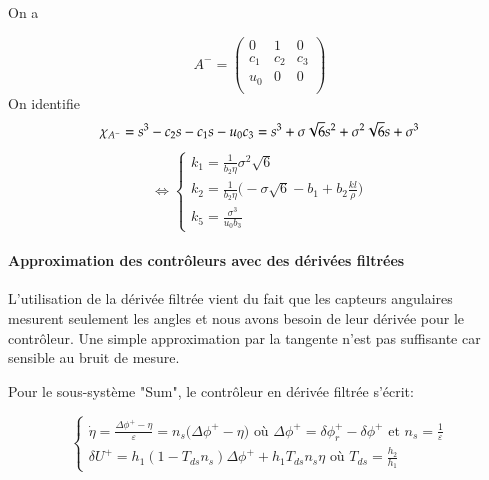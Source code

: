 \documentclass{report}
\begin{document}
On a

\begin{equation*}
    A^-=
    \begin{pmatrix}
        0 & 1 & 0 \\
        c_1 & c_2 & c_3 \\
        u_0 & 0 & 0 \\
    \end{pmatrix}
\end{equation*}
 On identifie
 \begin{equation*}
    \chi_{A^-} = s^3 - c_2s - c_1s - u_0c_3
    = s^3 + \sigma\sqrt{6}s^2 
    + \sigma^2\sqrt{6}s + \sigma^3 \\    
 \end{equation*}
 \begin{equation*}
    \Leftrightarrow
    \begin{cases}
        k_1 = \frac{1}{b_2\eta}\sigma^2\sqrt{6}  \\
        k_2 = \frac{1}{b_2\eta}\big(-\sigma\sqrt{6} - b_1 + b_2\frac{kl}{\rho} \big) \\
        k_5 = \frac{\sigma^3}{u_0b_3}  
    \end{cases}
 \end{equation*}

\paragraph{Approximation des contrôleurs avec des dérivées filtrées}

L'utilisation de la dérivée filtrée vient du fait que les capteurs
angulaires mesurent seulement les angles et nous avons besoin de
leur dérivée pour le contrôleur. Une simple approximation par la 
tangente n'est pas suffisante car sensible au bruit de mesure.

Pour le sous-système "Sum", le contrôleur en dérivée filtrée s'écrit:

\begin{equation*}
    \begin{cases}
        \dot{\eta} = \frac{\Delta \phi^+ - \eta}{\varepsilon}
        =  n_s\big(\Delta \phi^+ - \eta \big) 
        \text{ où } \Delta \phi^+ = \delta \phi^+_r - \delta \phi^+
        \text{ et } n_s = \frac{1}{\varepsilon} \\
        \delta{U^+} = h_1(1 - T_{ds}n_s)\Delta \phi^+ +
        h_1T_{ds}n_s\eta \text{ où } T_{ds} = \frac{h_2}{h_1} 
    \end{cases}
\end{equation*}
\end{document}
